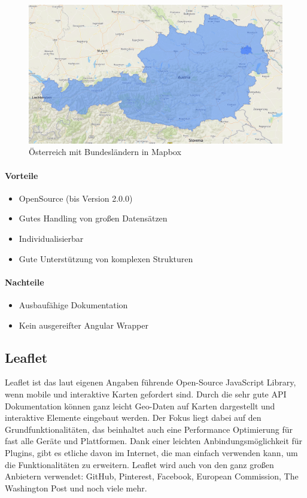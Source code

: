 \begin{figure}[hbt!]
    \centering
    \includegraphics[scale=0.25]{pics/austria-mapbox}
    \caption{Österreich mit Bundesländern in Mapbox}
    \label{fig:austria-mapbox}
\end{figure}

\paragraph{Vorteile}
\begin{itemize}
    \item OpenSource (bis Version 2.0.0)~\cite{mapbox-open-source}
    \item Gutes Handling von großen Datensätzen
    \item Individualisierbar
    \item Gute Unterstützung von komplexen Strukturen
\end{itemize}

\paragraph{Nachteile}
\begin{itemize}
    \item Ausbaufähige Dokumentation
    \item Kein ausgereifter Angular Wrapper
\end{itemize}

\subsection{Leaflet}
Leaflet ist das laut eigenen Angaben führende Open-Source JavaScript Library, wenn mobile und interaktive Karten gefordert sind.
Durch die sehr gute API Dokumentation können ganz leicht Geo-Daten auf Karten dargestellt und interaktive Elemente eingebaut werden.
Der Fokus liegt dabei auf den Grundfunktionalitäten, das beinhaltet auch eine Performance Optimierung für fast alle Geräte und Plattformen.
Dank einer leichten Anbindungsmöglichkeit für Plugins, gibt es etliche davon im Internet, die man einfach verwenden kann,
um die Funktionalitäten zu erweitern.
Leaflet wird auch von den ganz großen Anbietern verwendet: GitHub, Pinterest, Facebook, European Commission, The Washington Post und noch viele mehr.
~\cite{leaflet-doc}

